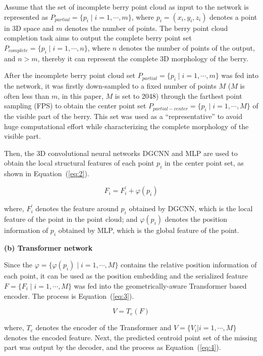 \documentclass[12pt]{article}
\begin{document}
Assume that the set of incomplete berry point cloud as input to the network is represented as $P_{partial}=\{p_i \mid i=1, \cdots, m \}$, where $p_i=(x_i,y_i,z_i)$ denotes a point in 3D space and $m$ denotes the number of points. 
The berry point cloud completion task aims to output the complete berry point set $P_{complete}=\{p_i \mid i=1, \cdots, n\}$, where $n$ denotes the number of points of the output, and $n > m$, thereby it can represent the complete 3D morphology of the berry.

After the incomplete berry point cloud set $P_{partial}=\{p_i \mid i=1,\cdots,m\}$ was fed into the network, it was firstly down-sampled to a fixed number of points $M$ ($M$ is often less than $m$, in this paper, $M$ is set to 2048) through the farthest point sampling (FPS) to obtain the center point set $P_{partial-center}=\{p_i \mid i=1, \cdots, M\}$ of the visible part of the berry. 
This set was used as a ``representative'' to avoid huge computational effort while characterizing the complete morphology of the visible part.

Then, the 3D convolutional neural networks DGCNN \citep{wang_dynamic_2019} and MLP \citep{tolstikhin_mlpmixer_2021} are used to obtain the local structural features of each point $p_i$ in the center point set, as shown in Equation~(\ref{eq:2}).

\begin{equation}
    F_i = F_{i}^{'} + \varphi(p_i)
    \label{eq:2}
\end{equation}

{\raggedright where, $F_{i}^{'}$ denotes the feature around $p_i$ obtained by DGCNN, which is the local feature of the point in the point cloud; and $\varphi(p_i)$ denotes the position information of $p_i$ obtained by MLP, which is the global feature of the point.}

{\raggedright\textbf{(b) Transformer network}}

Since the $\varphi = \{ \varphi(p_i) \mid i=1, \cdots, M \}$ contains the relative position information of each point, it can be used as the position embedding and the serialized feature $F = \{F_i \mid i=1, \cdots, M \}$ was fed into the geometrically-aware Transformer \citep{vaswani_attention_2017} based encoder. 
The process is Equation~(\ref{eq:3}).

\begin{equation}
    V = T_e(F)
    \label{eq:3}
\end{equation}

{\raggedright where, $T_e$ denotes the encoder of the Transformer and $V=\{V_i |i=1, \cdots, M\}$ denotes the encoded feature. 
Next, the predicted centroid point set of the missing part was output by the decoder, and the process as Equation~(\ref{eq:4}).}
\end{document}
